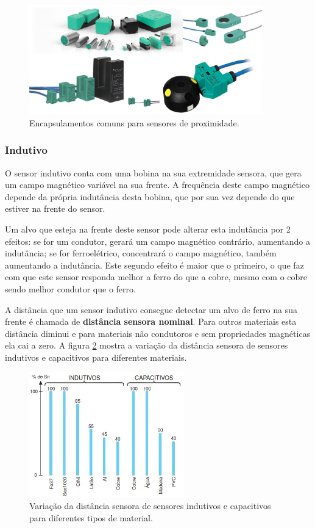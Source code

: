 \begin{figure}
  \centering
  \includegraphics[width=0.9\textwidth]{figuras/Sensores-de-Proximidade_2}
  \caption{Encapsulamentos comuns para sensores de proximidade.}\label{fig:proximidade}
\end{figure}

\subsubsection{Indutivo}
\label{subs:Indutivo}
O sensor indutivo conta com uma bobina na sua extremidade sensora, que gera um campo magnético variável na sua frente. A frequência deste campo magnético depende da própria indutância desta bobina, que por sua vez depende do que estiver na frente do sensor.

Um alvo que esteja na frente deste sensor pode alterar esta indutância por 2 efeitos: se for um condutor, gerará um campo magnético contrário, aumentando a indutância; se for ferroelétrico, concentrará o campo magnético, também aumentando a indutância. Este segundo efeito é maior que o primeiro, o que faz com que este sensor responda melhor a ferro do que a cobre, mesmo com o cobre sendo melhor condutor que o ferro.

A distância que um sensor indutivo consegue detectar um alvo de ferro na sua frente é chamada de \textbf{distância sensora nominal}. Para outros materiais esta distância diminui e para materiais não condutoros e sem propriedades magnéticas ela cai a zero. A figura \ref{fig:distancia_sensora} mostra a variação da distância sensora de sensores indutivos e capacitivos para diferentes materiais.

\begin{figure}
  \centering
  \includegraphics[width=0.6\textwidth]{figuras/distancia_sensora}
  \caption{Variação da distância sensora de sensores indutivos e capacitivos para diferentes tipos de material.}\label{fig:distancia_sensora}
\end{figure}

